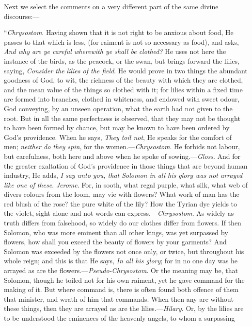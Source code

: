 Next we select the comments on a very different
part of the same divine discourse:—

``\emph{Chrysostom}. Having shown
that it is not right to be anxious about food, He passes to that which
is less, (for raiment is not so necessary as food), and asks, \emph{And why
are ye careful wherewith ye shall be clothed?} He uses not here the
instance of the birds, as the peacock, or the swan, but brings forward
the lilies, saying, \emph{Consider the lilies of the field}. He would
prove in two things the abundant goodness of God, to wit, the richness
of the beauty with which they are clothed, and the mean value of the
things so clothed with it; for lilies within a fixed time are formed
into branches, clothed in whiteness, and endowed with sweet odour, God
conveying, by an unseen operation, what the earth had not given to the
root. But in all the same perfectness is observed, that they may not be
thought to have been formed by chance, but may be known to have been
ordered by God's providence. When he says, \emph{They toil not}, He
speaks for the comfort of men; \emph{neither do they spin}, for the
women.—\emph{Chrysostom}. He forbids not labour, but carefulness, both
here and above when he spoke of sowing.—\emph{Gloss}. And for the
greater exaltation of God's providence in those things that are beyond
human industry, He adds, \emph{I say unto you, that Solomon in all his
glory was not arrayed like one of these}. \emph{Jerome}.
For, in sooth, what regal purple, what silk, what web of divers colours
from the loom, may vie with flowers? What work of man has the red blush
of the rose? the pure white of the lily? How the Tyrian dye yields to
the violet, sight alone and not words can express.—\emph{Chrysostom}.
As widely as truth differs from falsehood, so widely do our clothes
differ from flowers. If then Solomon, who was more eminent than all
other kings, was yet surpassed by flowers, how shall you exceed the
beauty of flowers by your garments? And Solomon was exceeded by the
flowers not once only, or twice, but throughout his whole reign; and
this is that He says, \emph{In all his glory}; for in no one day was he
arrayed as are the flowers.—\emph{Pseudo-Chrysostom}. Or the meaning
may be, that Solomon, though he toiled not for his own raiment, yet he
gave command for the making of it. But where command is, there is often
found both offence of them that minister, and wrath of him that
commands. When then any are without these things, then they are arrayed
as are the lilies.—\emph{Hilary}. Or, by the lilies are to be
understood the eminences of the heavenly angels, to whom a surpassing

